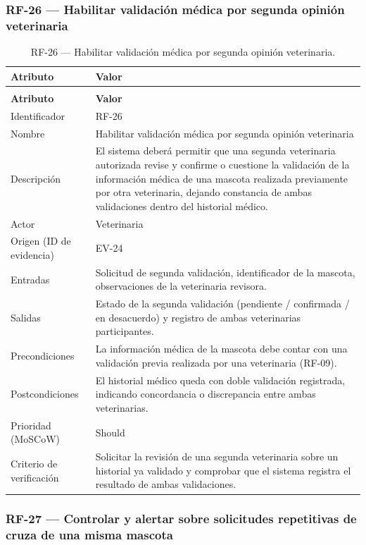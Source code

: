 \documentclass[journal,onecolumn]{IEEEtran}
\makeatletter
\newenvironment{atributos}[2]{%
	\small
	\begin{longtable}{@{}>{\raggedright\arraybackslash}p{4.2cm} >{\raggedright\arraybackslash}p{11.2cm}@{}}
		\caption{#2}\label{tab:#1}\\
		\toprule
		\textbf{Atributo} & \textbf{Valor} \\
		\midrule
		\endfirsthead
		\multicolumn{2}{@{}l}{\small\itshape (continuación)}\\
		\toprule
		\textbf{Atributo} & \textbf{Valor} \\
		\midrule
		\endhead
		\bottomrule
		\endlastfoot
	}{%
	\end{longtable}
	\normalsize
}
\makeatother
\begin{document}
	\subsubsection{RF-26 --- Habilitar validación médica por segunda opinión veterinaria}
	
	\begin{atributos}{RF-26}{RF-26 --- Habilitar validación médica por segunda opinión veterinaria.}
		Identificador & RF-26 \\
		Nombre & Habilitar validación médica por segunda opinión veterinaria \\
		Descripción & El sistema deberá permitir que una segunda veterinaria autorizada revise y confirme o cuestione la validación de la información médica de una mascota realizada previamente por otra veterinaria, dejando constancia de ambas validaciones dentro del historial médico. \\
		Actor & Veterinaria \\
		Origen (ID de evidencia) & EV-24 \\
		Entradas & Solicitud de segunda validación, identificador de la mascota, observaciones de la veterinaria revisora. \\
		Salidas & Estado de la segunda validación (pendiente / confirmada / en desacuerdo) y registro de ambas veterinarias participantes. \\
		Precondiciones & La información médica de la mascota debe contar con una validación previa realizada por una veterinaria (RF-09). \\
		Postcondiciones & El historial médico queda con doble validación registrada, indicando concordancia o discrepancia entre ambas veterinarias. \\
		Prioridad (MoSCoW) & Should \\
		Criterio de verificación & Solicitar la revisión de una segunda veterinaria sobre un historial ya validado y comprobar que el sistema registra el resultado de ambas validaciones. \\
	\end{atributos}
	
	\subsubsection{RF-27 --- Controlar y alertar sobre solicitudes repetitivas de cruza de una misma mascota}
	
\end{document}

